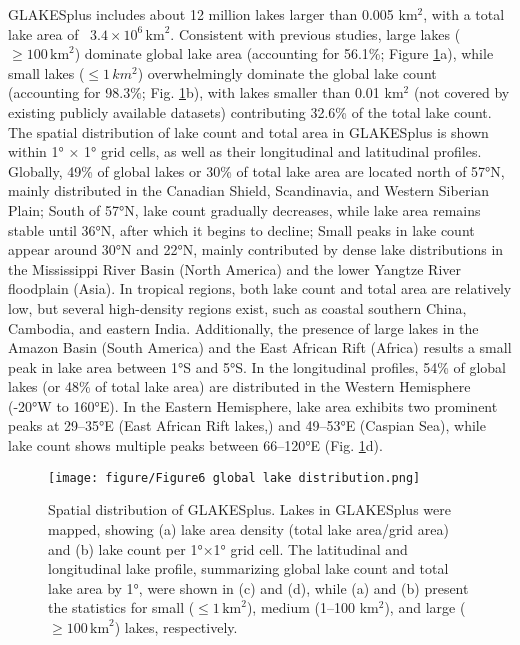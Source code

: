 \documentclass[preprint,12pt,authoryear]{elsarticle}
\begin{document}
GLAKESplus includes about 12 million lakes larger than 0.005 km$^2$, with a total lake area of ~$3.4 \times 10^6\, \text{km}^2$. Consistent with previous studies, large lakes ($\ge 100\, \text{km}^2$) dominate global lake area (accounting for 56.1\%; Figure \ref{fig:Fig6}a), while small lakes ($\le 1\, km^2$) overwhelmingly dominate the global lake count (accounting for 98.3\%; Fig. \ref{fig:Fig6}b), with lakes smaller than 0.01 km$^2$ (not covered by existing publicly available datasets) contributing 32.6\% of the total lake count. The spatial distribution of lake count and total area in GLAKESplus is shown within 1° × 1° grid cells, as well as their longitudinal and latitudinal profiles. Globally, 49\% of global lakes or 30\% of total lake area are located north of 57°N, mainly distributed in the Canadian Shield, Scandinavia, and Western Siberian Plain; South of 57°N, lake count gradually decreases, while lake area remains stable until 36°N, after which it begins to decline; Small peaks in lake count appear around 30°N and 22°N, mainly contributed by dense lake distributions in the Mississippi River Basin (North America) and the lower Yangtze River floodplain (Asia). In tropical regions, both lake count and total area are relatively low, but several high-density regions exist, such as coastal southern China, Cambodia, and eastern India. Additionally, the presence of large lakes in the Amazon Basin (South America) and the East African Rift (Africa) results a small peak in lake area between 1°S and 5°S. In the longitudinal profiles, 54\% of global lakes (or 48\% of total lake area) are distributed in the Western Hemisphere (-20°W to 160°E). In the Eastern Hemisphere, lake area exhibits two prominent peaks at 29–35°E (East African Rift lakes,) and 49–53°E (Caspian Sea), while lake count shows multiple peaks between 66–120°E (Fig. \ref{fig:Fig6}d).

\begin{figure}[h]
    \centering
    \texttt{[image: figure/Figure6 global lake distribution.png]}
    \caption{Spatial distribution of GLAKESplus. Lakes in GLAKESplus were mapped, showing (a) lake area density (total lake area/grid area) and (b) lake count per 1°×1° grid cell. The latitudinal and longitudinal lake profile, summarizing global lake count and total lake area by 1°, were shown in (c) and (d), while (a) and (b) present the statistics for small ($\le 1 \,\text{km}^2$), medium (1–100 km$^2$), and large ($\ge 100 \,\text{km}^2$) lakes, respectively.}
    \label{fig:Fig6}
\end{figure}
\end{document}
